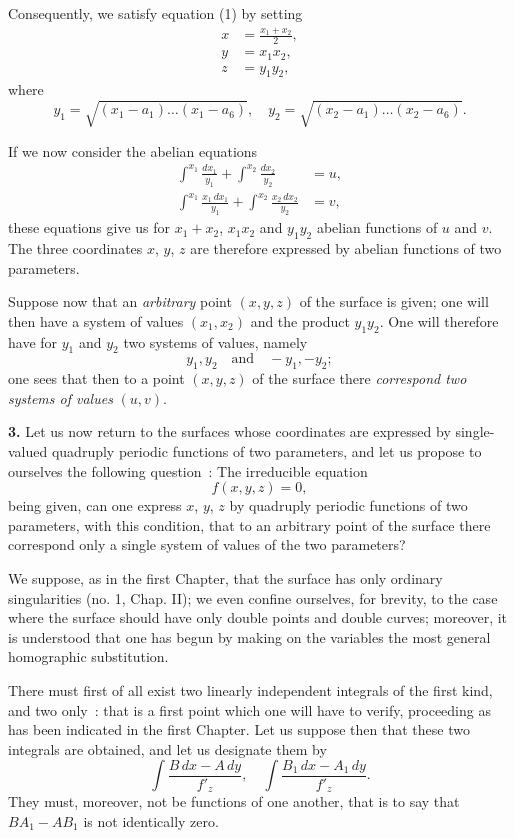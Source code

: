 \documentclass{article}
\begin{document}
Consequently, we satisfy equation (1) by setting
\[
\begin{aligned}
x &= \frac{x_{1} + x_{2}}{2}, \\
y &= x_{1}x_{2}, \\
z &= y_{1}y_{2},
\end{aligned}
\]
where
\[
y_{1} = \sqrt{(x_{1} - a_{1})\ldots(x_{1} - a_{6})}, \quad y_{2} = \sqrt{(x_{2} - a_{1})\ldots(x_{2} - a_{6})}.
\]

If we now consider the abelian equations
\[
\begin{aligned}
\int^{x_{1}} \frac{dx_{1}}{y_{1}} + \int^{x_{2}} \frac{dx_{2}}{y_{2}} &= u, \\
\int^{x_{1}} \frac{x_{1}\,dx_{1}}{y_{1}} + \int^{x_{2}} \frac{x_{2}\,dx_{2}}{y_{2}} &= v,
\end{aligned}
\]
these equations give us for $x_{1} + x_{2}$, $x_{1}x_{2}$ and $y_{1}y_{2}$ abelian functions of $u$ and $v$. The three coordinates $x$, $y$, $z$ are therefore expressed by abelian functions of two parameters.

Suppose now that an \emph{arbitrary} point $(x, y, z)$ of the surface is given; one will then have a system of values $(x_{1}, x_{2})$ and the product $y_{1}y_{2}$. One will therefore have for $y_{1}$ and $y_{2}$ two systems of values, namely
\[
y_{1}, y_{2} \quad \text{and} \quad -y_{1}, -y_{2};
\]
one sees that then to a point $(x, y, z)$ of the surface there \emph{correspond two systems of values} $(u, v)$.

\textbf{3.} Let us now return to the surfaces whose coordinates are expressed by single-valued quadruply periodic functions of two parameters, and let us propose to ourselves the following question~: The irreducible equation
\[
f(x, y, z) = 0,
\]
being given, can one express $x$, $y$, $z$ by quadruply periodic functions of two parameters, with this condition, that to an arbitrary point of the surface there correspond only a single system of values of the two parameters?

We suppose, as in the first Chapter, that the surface has only ordinary singularities (no. 1, Chap. II); we even confine ourselves, for brevity, to the case where the surface should have only double points and double curves; moreover, it is understood that one has begun by making on the variables the most general homographic substitution.

There must first of all exist two linearly independent integrals of the first kind, and two only~: that is a first point which one will have to verify, proceeding as has been indicated in the first Chapter. Let us suppose then that these two integrals are obtained, and let us designate them by
\[
\int \frac{B\,dx - A\,dy}{f'_{z}}, \quad \int \frac{B_{1}\,dx - A_{1}\,dy}{f'_{z}}.
\]
They must, moreover, not be functions of one another, that is to say that $BA_{1} - AB_{1}$ is not identically zero.
\end{document}
